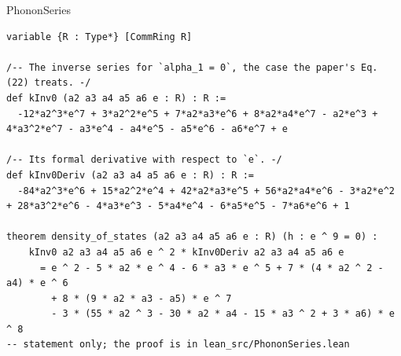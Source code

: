 \begin{leanbox}{PhononSeries}
\begin{lstlisting}[style=lean,basicstyle=\ttfamily\footnotesize]
variable {R : Type*} [CommRing R]

/-- The inverse series for `alpha_1 = 0`, the case the paper's Eq. (22) treats. -/
def kInv0 (a2 a3 a4 a5 a6 e : R) : R :=
  -12*a2^3*e^7 + 3*a2^2*e^5 + 7*a2*a3*e^6 + 8*a2*a4*e^7 - a2*e^3 + 4*a3^2*e^7 - a3*e^4 - a4*e^5 - a5*e^6 - a6*e^7 + e

/-- Its formal derivative with respect to `e`. -/
def kInv0Deriv (a2 a3 a4 a5 a6 e : R) : R :=
  -84*a2^3*e^6 + 15*a2^2*e^4 + 42*a2*a3*e^5 + 56*a2*a4*e^6 - 3*a2*e^2 + 28*a3^2*e^6 - 4*a3*e^3 - 5*a4*e^4 - 6*a5*e^5 - 7*a6*e^6 + 1

theorem density_of_states (a2 a3 a4 a5 a6 e : R) (h : e ^ 9 = 0) :
    kInv0 a2 a3 a4 a5 a6 e ^ 2 * kInv0Deriv a2 a3 a4 a5 a6 e
      = e ^ 2 - 5 * a2 * e ^ 4 - 6 * a3 * e ^ 5 + 7 * (4 * a2 ^ 2 - a4) * e ^ 6
        + 8 * (9 * a2 * a3 - a5) * e ^ 7
        - 3 * (55 * a2 ^ 3 - 30 * a2 * a4 - 15 * a3 ^ 2 + 3 * a6) * e ^ 8
-- statement only; the proof is in lean_src/PhononSeries.lean
\end{lstlisting}
\end{leanbox}

